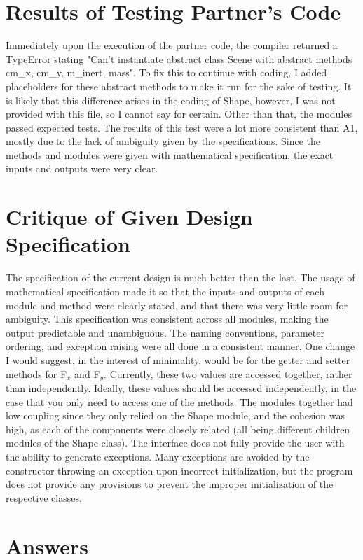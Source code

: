 \documentclass[12pt]{article}
\begin{document}
\section{Results of Testing Partner's Code}
Immediately upon the execution of the partner code, the compiler returned a TypeError stating "Can't instantiate abstract class Scene with abstract methods cm\_x, cm\_y, m\_inert, mass". To fix this to continue with coding, I added placeholders for these abstract methods to make it run for the sake of testing. It is likely that this difference arises in the coding of Shape, however, I was not provided with this file, so I cannot say for certain. Other than that, the modules passed expected tests. The results of this test were a lot more consistent than A1, mostly due to the lack of ambiguity given by the specifications. Since the methods and modules were given with mathematical specification, the exact inputs and outputs were very clear. 

\section{Critique of Given Design Specification}
The specification of the current design is much better than the last. The usage of mathematical specification made it so that the inputs and outputs of each module and method were clearly stated, and that there was very little room for ambiguity. This specification was consistent across all modules, making the output predictable and unambiguous. The naming conventions, parameter ordering, and exception raising were all done in a consistent manner. One change I would suggest, in the interest of minimality, would be for the getter and setter methods for F$_x$ and F$_y$. Currently, these two values are accessed together, rather than independently. Ideally, these values should be accessed independently, in the case that you only need to access one of the methods. The modules together had low coupling since they only relied on the Shape module, and the cohesion was high, as each of the components were closely related (all being different children modules of the Shape class). The interface does not fully provide the user with the ability to generate exceptions. Many exceptions are avoided by the constructor throwing an exception upon incorrect initialization, but the program does not provide any provisions to prevent the improper initialization of the respective classes. 

\section{Answers}
\end{document}
